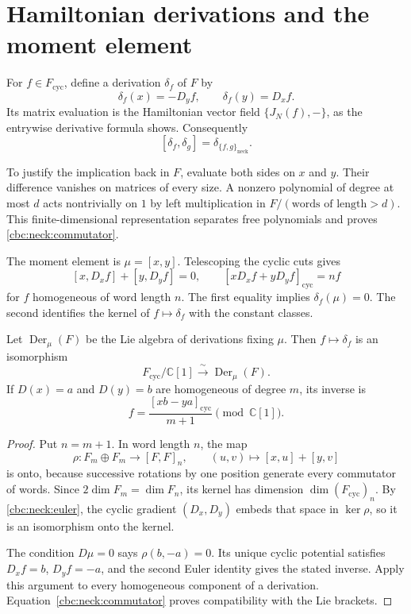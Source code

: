 \section{Hamiltonian derivations and the moment element}
For $f\in F_{\mathrm{cyc}}$, define a derivation $\delta_f$ of $F$ by
\begin{equation}\label{cbc:neck:hamiltonian}
 \delta_f(x)=-D_yf,\qquad \delta_f(y)=D_xf.
\end{equation}
Its matrix evaluation is the Hamiltonian vector field
$\{J_N(f),-\}$, as the entrywise derivative formula shows.  Consequently
\begin{equation}\label{cbc:neck:commutator}
 [\delta_f,\delta_g]=\delta_{\{f,g\}_{\mathrm{neck}}}.
\end{equation}

To justify the implication back in $F$, evaluate both sides on $x$ and $y$.
Their difference vanishes on matrices of every size.  A nonzero polynomial
of degree at most $d$ acts nontrivially on $1$ by left multiplication in
$F/(\text{words of length}>d)$.  This finite-dimensional representation
separates free polynomials and proves \eqref{cbc:neck:commutator}.

The moment element is $\mu=[x,y]$.  Telescoping the cyclic cuts gives
\begin{equation}\label{cbc:neck:euler}
 [x,D_xf]+[y,D_yf]=0,
 \qquad [xD_xf+yD_yf]_{\mathrm{cyc}}=nf
\end{equation}
for $f$ homogeneous of word length $n$.  The first equality implies
$\delta_f(\mu)=0$.  The second identifies the kernel of $f\mapsto\delta_f$
with the constant classes.

\begin{proposition}\label{cbc:neck:potential}
Let $\operatorname{Der}_{\mu}(F)$ be the Lie algebra of derivations fixing
$\mu$.  Then $f\mapsto\delta_f$ is an isomorphism
\[
 F_{\mathrm{cyc}}/\mathbb C[1]\xrightarrow{\ \sim\ }
 \operatorname{Der}_{\mu}(F).
\]
If $D(x)=a$ and $D(y)=b$ are homogeneous of degree $m$, its inverse is
\[
 f=\frac{[xb-ya]_{\mathrm{cyc}}}{m+1}\pmod{\mathbb C[1]}.
\]
\end{proposition}
\begin{proof}
Put $n=m+1$.  In word length $n$, the map
\[
 \rho:F_m\oplus F_m\longrightarrow[F,F]_n,
 \qquad (u,v)\longmapsto[x,u]+[y,v]
\]
is onto, because successive rotations by one position generate every
commutator of words.  Since $2\dim F_m=\dim F_n$, its kernel has dimension
$\dim(F_{\mathrm{cyc}})_n$.  By \eqref{cbc:neck:euler}, the cyclic gradient
$(D_x,D_y)$ embeds that space in $\ker\rho$, so it is an isomorphism onto
the kernel.

The condition $D\mu=0$ says $\rho(b,-a)=0$.  Its unique cyclic potential
satisfies $D_xf=b$, $D_yf=-a$, and the second Euler identity gives the
stated inverse.  Apply this argument to every homogeneous component of a
derivation.  Equation~\eqref{cbc:neck:commutator} proves compatibility with
the Lie brackets.
\end{proof}

